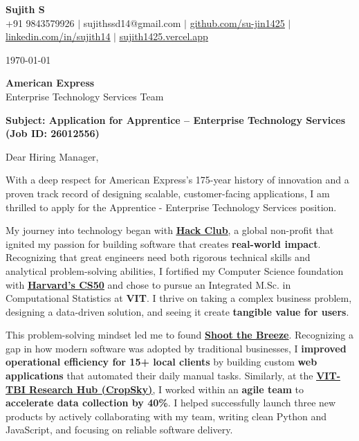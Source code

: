 \documentclass[a4paper,11pt]{article}
\newcommand{\ulink}[2]{\href{#1}{\uline{#2}}}
\begin{document}
\pagestyle{empty}

\begin{center}
{\color[HTML]{000000}\fontsize{30}{35}\selectfont\bfseries Sujith S} \\[5pt]
{\fontsize{10.5}{12.5}\selectfont\textcolor[HTML]{3A3A3A}{+91 9843579926 $|$ sujithssd14@gmail.com $|$ \ulink{https://github.com/su-jin1425}{github.com/su-jin1425} $|$ \ulink{https://linkedin.com/in/sujith14}{linkedin.com/in/sujith14} $|$ \ulink{https://sujith1425.vercel.app}{sujith1425.vercel.app}}}
\end{center}

\vspace{10pt}

\today

\textbf{American Express} \\
Enterprise Technology Services Team

\textbf{Subject: Application for Apprentice -- Enterprise Technology Services (Job ID: 26012556)}

Dear Hiring Manager,

With a deep respect for American Express's 175-year history of innovation and a proven track record of designing scalable, customer-facing applications, I am thrilled to apply for the Apprentice - Enterprise Technology Services position.

My journey into technology began with \ulink{https://hackclub.com/}{\textbf{Hack Club}}, a global non-profit that ignited my passion for building software that creates \textbf{real-world impact}. Recognizing that great engineers need both rigorous technical skills and analytical problem-solving abilities, I fortified my Computer Science foundation with \ulink{https://cs50.harvard.edu/}{\textbf{Harvard's CS50}} and chose to pursue an Integrated M.Sc. in Computational Statistics at \textbf{VIT}. I thrive on taking a complex business problem, designing a data-driven solution, and seeing it create \textbf{tangible value for users}.

This problem-solving mindset led me to found \ulink{https://shoot-the-breeze.vercel.app}{\textbf{Shoot the Breeze}}. Recognizing a gap in how modern software was adopted by traditional businesses, I \textbf{improved operational efficiency for 15+ local clients} by building custom \textbf{web applications} that automated their daily manual tasks. Similarly, at the \ulink{https://sites.google.com/view/cropsky/home}{\textbf{VIT-TBI Research Hub (CropSky)}}, I worked within an \textbf{agile team} to \textbf{accelerate data collection by 40\%}. I helped successfully launch three new products by actively collaborating with my team, writing clean Python and JavaScript, and focusing on reliable software delivery.
\end{document}
